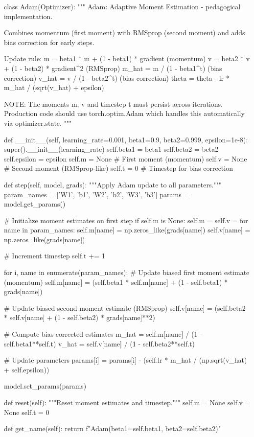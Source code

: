 \documentclass[../../main.tex]{subfiles}
\begin{document}
\begin{pythoncode}
class Adam(Optimizer):
    """
    Adam: Adaptive Moment Estimation - pedagogical implementation.

    Combines momentum (first moment) with RMSprop (second moment)
    and adds bias correction for early steps.

    Update rule:
        m = beta1 * m + (1 - beta1) * gradient        (momentum)
        v = beta2 * v + (1 - beta2) * gradient^2      (RMSprop)
        m_hat = m / (1 - beta1^t)                     (bias correction)
        v_hat = v / (1 - beta2^t)                     (bias correction)
        theta = theta - lr * m_hat / (sqrt(v_hat) + epsilon)

    NOTE: The moments m, v and timestep t must persist across iterations.
    Production code should use torch.optim.Adam which handles
    this automatically via optimizer.state.
    """

    def __init__(self, learning_rate=0.001, beta1=0.9, beta2=0.999,
                 epsilon=1e-8):
        super().__init__(learning_rate)
        self.beta1 = beta1
        self.beta2 = beta2
        self.epsilon = epsilon
        self.m = None  # First moment (momentum)
        self.v = None  # Second moment (RMSprop-like)
        self.t = 0     # Timestep for bias correction

    def step(self, model, grads):
        """Apply Adam update to all parameters."""
        param_names = ['W1', 'b1', 'W2', 'b2', 'W3', 'b3']
        params = model.get_params()

        # Initialize moment estimates on first step
        if self.m is None:
            self.m = {}
            self.v = {}
            for name in param_names:
                self.m[name] = np.zeros_like(grads[name])
                self.v[name] = np.zeros_like(grads[name])

        # Increment timestep
        self.t += 1

        for i, name in enumerate(param_names):
            # Update biased first moment estimate (momentum)
            self.m[name] = (self.beta1 * self.m[name] +
                          (1 - self.beta1) * grads[name])

            # Update biased second moment estimate (RMSprop)
            self.v[name] = (self.beta2 * self.v[name] +
                          (1 - self.beta2) * grads[name]**2)

            # Compute bias-corrected estimates
            m_hat = self.m[name] / (1 - self.beta1**self.t)
            v_hat = self.v[name] / (1 - self.beta2**self.t)

            # Update parameters
            params[i] = params[i] - (self.lr * m_hat /
                                     (np.sqrt(v_hat) + self.epsilon))

        model.set_params(params)

    def reset(self):
        """Reset moment estimates and timestep."""
        self.m = None
        self.v = None
        self.t = 0

    def get_name(self):
        return f"Adam(beta1={self.beta1}, beta2={self.beta2})"
\end{pythoncode}
\end{document}
